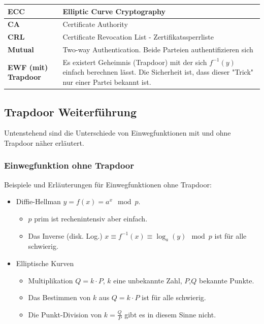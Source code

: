 \documentclass[12pt]{scrartcl}
\begin{document}
\begin{center}
\begin{tabular}{ | m{12em} | m{25em} | }
        \hline
        \textbf{ECC}                    & Elliptic Curve Cryptography                               \\
        \hline
        \textbf{CA}                     & Certificate Authority                                     \\
        \hline
        \textbf{CRL}                    & Certificate Revocation List - Zertifikatssperrliste                                     \\
        \hline
        \textbf{Mutual}                 & Two-way Authentication. Beide Parteien authentifizieren sich                                     \\
        \hline
        \textbf{EWF (mit) Trapdoor}     & Es existert Geheimnis (Trapdoor) mit der sich $f^{-1}(y)$ 
                                            einfach berechnen lässt. Die Sicherheit ist, dass dieser "Trick" \space
                                            nur einer Partei bekannt ist.                                     \\
        \hline
    \end{tabular}
\end{center}


\newpage
\subsection{Trapdoor Weiterführung}

Untenstehend sind die Unterschiede von Einwegfunktionen mit und ohne Trapdoor näher 
erläutert.

\subsubsection{Einwegfunktion ohne Trapdoor}

Beispiele und Erläuterungen für Einwegfunktionen ohne Trapdoor:

\begin{itemize}
    \item Diffie-Hellman $y = f(x) = a^x \mod p$.
    \begin{itemize}
        \item $p$ prim ist rechenintensiv aber einfach.
        \item Das Inverse (disk. Log.) $x \equiv f^{-1}(x) \equiv \log_a(y) \mod p$ 
        ist für alle schwierig.
    \end{itemize}
    \item Elliptische Kurven
    \begin{itemize}
        \item Multiplikation $Q = k \cdot P$, $k$ eine unbekannte Zahl, $P$,$Q$ bekannte
        Punkte.
        \item Das Bestimmen von $k$ aus $Q = k \cdot P$ ist für alle schwierig.
        \item Die Punkt-Division von $\displaystyle{k = \frac{Q}{P}}$ gibt es in diesem Sinne nicht.
    \end{itemize}
\end{itemize}
\end{document}
